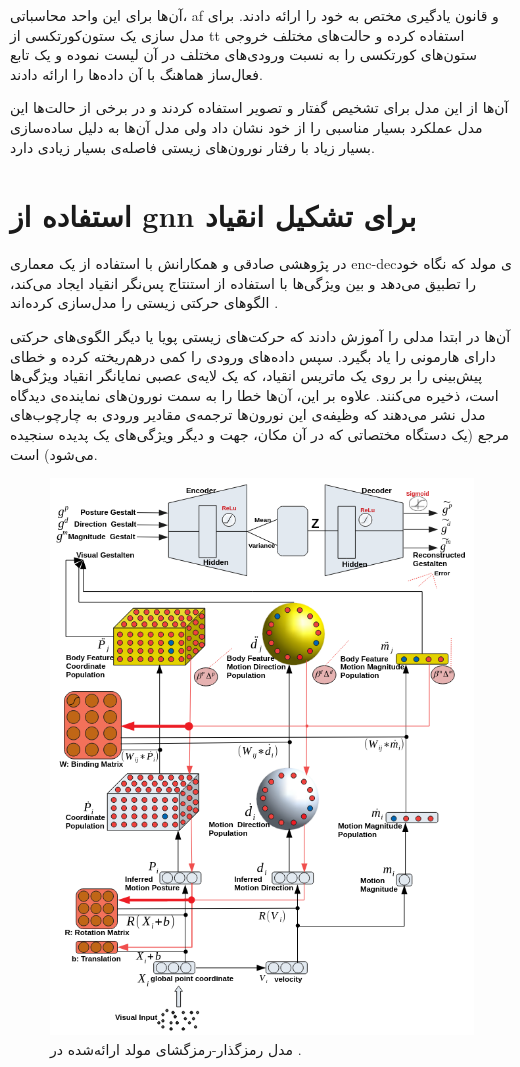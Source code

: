 \documentclass[12pt]{report}
\begin{document}
آن‌ها برای این واحد محاسباتی، \gls{af} و قانون یادگیری مختص به خود را ارائه دادند. برای مدل سازی یک ستون‌کورتکسی از \gls{tt} استفاده کرده و حالت‌های مختلف خروجی ستون‌های کورتکسی را به نسبت ورودی‌های مختلف در آن لیست نموده و  یک تابع فعال‌ساز هماهنگ با آن داده‌ها را ارائه دادند. 

آن‌ها از این مدل برای تشخیص گفتار و تصویر استفاده کردند و در برخی از حالت‌ها این مدل عملکرد بسیار مناسبی را از خود نشان داد ولی مدل آن‌ها به دلیل ساده‌سازی بسیار زیاد با رفتار نورون‌های زیستی فاصله‌ی بسیار زیادی دارد.


\section{استفاده از \gls{gnn} برای تشکیل انقیاد}
در پژوهشی صادقی و همکارانش با استفاده از یک معماری \gls{enc-dec}ی مولد که نگاه خود را تطبیق می‌دهد و بین ویژگی‌ها با استفاده از استنتاج پس‌نگر انقیاد ایجاد می‌کند، الگو‌های حرکتی زیستی را مدل‌سازی کرده‌اند \cite{Sadeghi2021}.

آن‌ها در ابتدا مدلی را آموزش دادند که حرکت‌های زیستی پویا یا دیگر الگوی‌های حرکتی دارای‌ هارمونی را یاد بگیرد. سپس داده‌های ورودی را کمی درهم‌ریخته‌ کرده و خطای پیش‌بینی را بر روی یک ماتریس انقیاد، که یک لایه‌ی عصبی نمایانگر انقیاد ویژگی‌ها است، ذخیره می‌کنند. علاوه‌ بر این، آن‌ها خطا را به سمت نورون‌های نماینده‌ی دیدگاه مدل نشر می‌دهند که وظیفه‌ی این نورون‌ها ترجمه‌ی مقادیر ورودی به چارچوب‌های مرجع (یک دستگاه مختصاتی که در آن مکان، جهت و دیگر ویژگی‌های یک پدیده سنجیده می‌شود) است.

\begin{figure}[]
	\centering
	\includegraphics[width=0.8\linewidth]{gnn.png}
	\caption[NS]{
		مدل رمزگذار-رمزگشای مولد ارائه‌شده در  \cite{Sadeghi2021}.
	}
	\label{fig:gnn}
\end{figure}
\end{document}
